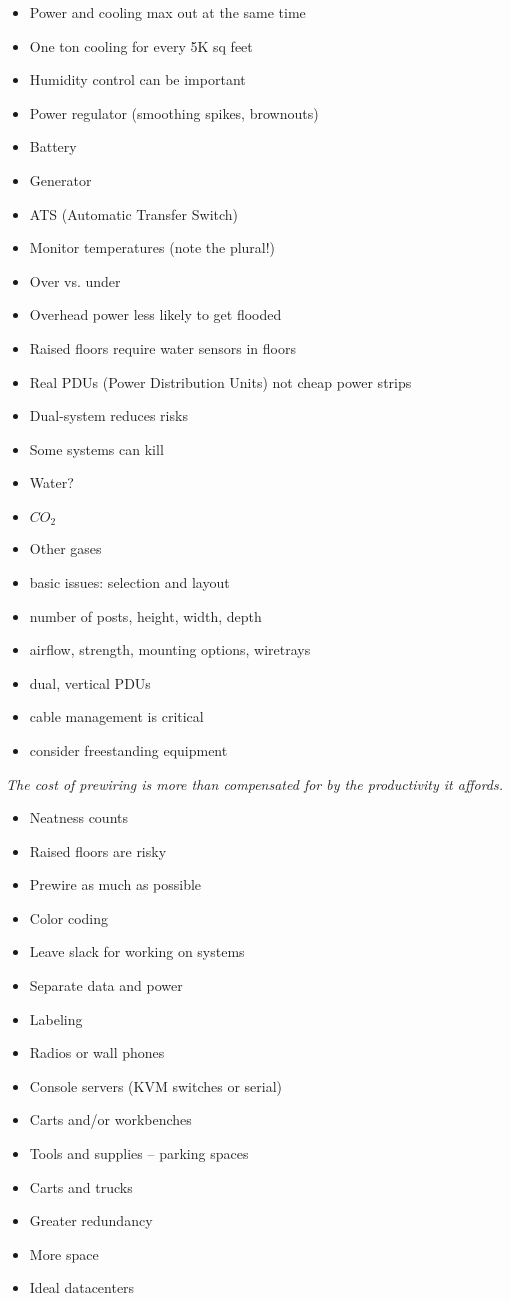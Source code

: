 \documentclass{slides}
\newcommand{\bi}{\begin{itemize}}
\newcommand{\ei}{\end{itemize}}
\begin{document}
\bi
\item Power and cooling max out at the same time
\item One ton cooling for every 5K sq feet
\item Humidity control can be important
\item Power regulator (smoothing spikes, brownouts)
\item Battery
\item Generator
\item ATS (Automatic Transfer Switch)
\item Monitor temperatures (note the plural!)
\ei


\bi
\item Over  vs. under
\item Overhead power less likely to get flooded
\item Raised floors require water sensors in floors
\item Real PDUs (Power Distribution Units) not cheap power strips
\item Dual-system reduces risks
\ei


\bi
\item Some systems can kill
\item Water?
\item $CO_2$
\item Other gases
\ei


\bi
\item basic issues: selection and layout
\item number of posts, height, width, depth
\item airflow, strength, mounting options, wiretrays
\item dual, vertical PDUs
\item cable management is critical
\item consider freestanding equipment
\ei


\emph{The cost of prewiring is more than compensated for by the productivity
it affords.}

\bi
\item Neatness counts
\item Raised floors are risky
\item Prewire as much as possible
\item Color coding
\item Leave slack for working on systems
\item Separate data and power
\item Labeling
\ei


\bi
\item Radios or wall phones
\item Console servers (KVM switches or serial)
\item Carts and/or workbenches
\item Tools and supplies -- parking spaces
\item Carts and trucks
\ei


\bi
\item Greater redundancy
\item More space
\item Ideal datacenters
\ei
\end{document}
